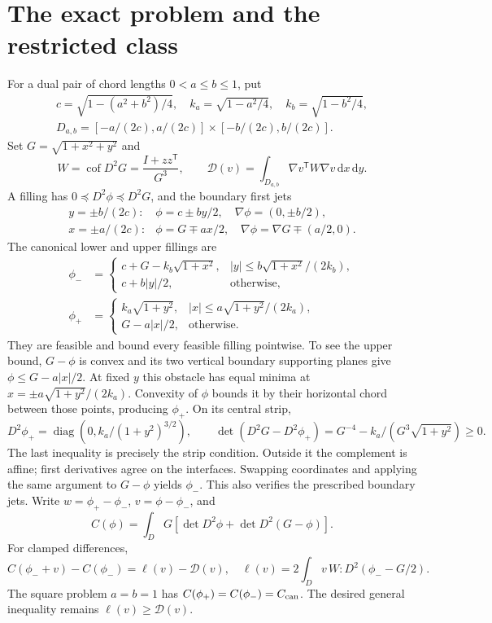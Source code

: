 \documentclass[11pt]{article}
\theoremstyle{remark}\newtheorem{remark}[theorem]{Remark}
\newcommand{\dd}{\,\mathrm d}
\newcommand{\Dir}{\mathcal D}
\begin{document}
\section{The exact problem and the restricted class}
For a dual pair of chord lengths $0<a\leq b\leq1$, put
\[
 \begin{gathered}
 c=\sqrt{1-(a^2+b^2)/4},\quad k_a=\sqrt{1-a^2/4},\quad k_b=\sqrt{1-b^2/4},\\
 D_{a,b}=[-a/(2c),a/(2c)]\times[-b/(2c),b/(2c)].
 \end{gathered}
\]
Set $G=\sqrt{1+x^2+y^2}$ and
\[
 W=\operatorname{cof}D^2G=\frac{I+zz^{\mathsf T}}{G^3},\qquad
 \Dir(v)=\int_{D_{a,b}}\nabla v^{\mathsf T}W\nabla v\dd x\dd y.
\]
A filling has $0\preceq D^2\phi\preceq D^2G$, and the boundary first jets
\[
 \begin{array}{ll}
 y=\pm b/(2c):&\phi=c\pm by/2,\quad\nabla\phi=(0,\pm b/2),\\
 x=\pm a/(2c):&\phi=G\mp ax/2,\quad\nabla\phi=\nabla G\mp(a/2,0).
 \end{array}
\]
The canonical lower and upper fillings are
\begin{align}
 \phi_-&=\begin{cases}c+G-k_b\sqrt{1+x^2},&|y|\leq b\sqrt{1+x^2}/(2k_b),\\
 c+b|y|/2,&\text{otherwise},\end{cases}\label{cell:minus}\\
 \phi_+&=\begin{cases}k_a\sqrt{1+y^2},&|x|\leq a\sqrt{1+y^2}/(2k_a),\\
 G-a|x|/2,&\text{otherwise}.\end{cases}\label{cell:plus}
\end{align}
They are feasible and bound every feasible filling pointwise. To see the upper bound, $G-\phi$ is convex and its two vertical boundary supporting planes give $\phi\leq G-a|x|/2$. At fixed $y$ this obstacle has equal minima at $x=\pm a\sqrt{1+y^2}/(2k_a)$. Convexity of $\phi$ bounds it by their horizontal chord between those points, producing $\phi_+$. On its central strip,
\[
 D^2\phi_+=\operatorname{diag}(0,k_a/(1+y^2)^{3/2}),\qquad
 \det(D^2G-D^2\phi_+)=G^{-4}-k_a/(G^3\sqrt{1+y^2})\geq0.
\]
The last inequality is precisely the strip condition. Outside it the complement is affine; first derivatives agree on the interfaces. Swapping coordinates and applying the same argument to $G-\phi$ yields $\phi_-$. This also verifies the prescribed boundary jets. Write $w=\phi_+-\phi_-$, $v=\phi-\phi_-$, and
\[
 C(\phi)=\int_D G[\det D^2\phi+\det D^2(G-\phi)].
\]
For clamped differences,
\begin{equation}\label{cell:quadratic}
 C(\phi_-+v)-C(\phi_-)=\ell(v)-\Dir(v),\quad
 \ell(v)=2\int_Dv\,W:D^2(\phi_--G/2).
\end{equation}
The square problem $a=b=1$ has $C(\phi_+)=C(\phi_-)=C_{\rm can}$.
The desired general inequality remains $\ell(v)\geq\Dir(v)$.
\end{document}

